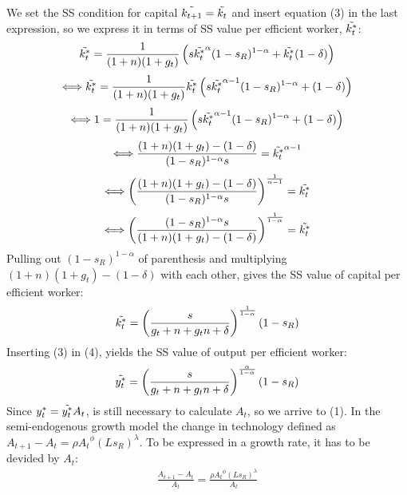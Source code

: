 \documentclass[11pt]{article} %
\begin{document}
We set the SS condition for capital $\Tilde{k_{t+1}}=\Tilde{k_{t}}$ and insert equation (3) in the last expression, so we express it in terms of SS value per efficient worker, $\Tilde{k_{t}^*}$:
\begin{align*}
    \Tilde{k_{t}^*}=\frac{1}{(1+n)(1+g_t)}\left(s\Tilde{k_{t}^*}^{\alpha}(1-s_R)^{1-\alpha}+\Tilde{k_{t}^*}(1-\delta)\right)
\end{align*}
\begin{align*}
    \Longleftrightarrow\Tilde{k_{t}^*}=\frac{1}{(1+n)(1+g_t)}\Tilde{k_{t}^*}\left(s\Tilde{k_{t}^*}^{\alpha-1}(1-s_R)^{1-\alpha}+(1-\delta)\right)
\end{align*}
\begin{align*}
    \Longleftrightarrow1=\frac{1}{(1+n)(1+g_t)}\left(s\Tilde{k_{t}^*}^{\alpha-1}(1-s_R)^{1-\alpha}+(1-\delta)\right)
\end{align*}
\begin{align*}
    \Longleftrightarrow \frac{(1+n)(1+g_t)-(1-\delta)}{(1-s_R)^{1-\alpha}s}=\Tilde{k_{t}^*}^{\alpha-1}
\end{align*}
\begin{align*}
    \Longleftrightarrow \left(\frac{(1+n)(1+g_t)-(1-\delta)}{(1-s_R)^{1-\alpha}s}\right)^{\frac{1}{\alpha-1}}=\Tilde{k_{t}^*}
\end{align*}
\begin{align*}
    \Longleftrightarrow \left(\frac{(1-s_R)^{1-\alpha}s}{(1+n)(1+g_t)-(1-\delta)}\right)^{\frac{1}{1-\alpha}}=\Tilde{k_{t}^*}
\end{align*}
Pulling out $(1-s_R)^{1-\alpha}$ of parenthesis and multiplying $(1+n)(1+g_t)-(1-\delta)$ with each other, gives the SS value of capital per efficient worker:
\begin{equation}
    \Tilde{k_{t}^*}=\left(\frac{s}{g_t+n+g_tn+\delta}\right)^{\frac{1}{1-\alpha}}(1-s_R)
\end{equation}
Inserting (3) in (4), yields the SS value of output per efficient worker: 
\begin{equation}
    \Tilde{y_{t}^*}=\left(\frac{s}{g_t+n+g_tn+\delta}\right)^{\frac{\alpha}{1-\alpha}}(1-s_R)
\end{equation}
Since $y_t^*=\Tilde{y_t^*}A_t$, is still necessary to calculate $A_t$, so we arrive to (1). In the semi-endogenous growth model the change in technology defined as $A_{t+1}-A_t = {\rho}{A_t}^{\phi}(Ls_R)^{\lambda}$. To be expressed in a growth rate, it has to be devided by $A_t$:
\begin{align*}
    \frac{A_{t+1}-A_t}{A_t} = \frac{{\rho}{A_t}^{\phi}(Ls_R)^{\lambda}}{A_t}
\end{align*}
\end{document}
